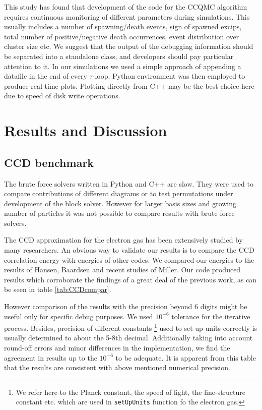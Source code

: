\documentclass[twoside,english]{uiofysmaster}
\newcommand{\classname}[1]{\texttt{#1}}
\begin{document}
This study has found that development of the code for the CCQMC
algorithm requires continuous monitoring of different parameters
during simulations. This usually includes a number of spawning/death
events, sign of spawned excips, total number of positive/negative
death occurrences, event distribution over cluster size etc.  We
suggest that the output of the debugging information should be separated into a
standalone class, and developers should pay particular attention to
it. In our simulations we used a simple approach of appending a
datafile in the end of every $\tau$-loop. Python environment was then
employed to produce real-time plots. Plotting directly from C++ may be
the best choice here due to speed of disk write operations.

\chapter{Results and Discussion}






\section{CCD benchmark}

The brute force solvers written in Python and C++ are slow. They were
used to compare contributions of different diagrams or to test
permutations under development of the block solver. However for larger
basis sizes and growing number of particles it was not possible to
compare results with brute-force solvers.

The CCD approximation for the electron gas has been extensively studied by
many researchers. An obvious way to validate our results is to compare
the CCD correlation energy with energies of other codes. We compared our
energies to the results of Hansen\cite{HansenCoupledclusterstudies},
Baardsen \cite{BaardsenCoupledclustertheoryinfinite2014} and recent
studies of Miller\cite{MillerQuantumMechanicalStudies2017}. Our code
produced results which corroborate the findings of a great deal of the
previous work, as can be seen in table \ref{tab:CCDcompar}.

However comparison of the results with the precision beyond 6 digits
might be useful only for specific debug purposes. We used $10^{-6}$
tolerance for the iterative process. Besides, precision of different
constants \footnote{We refer here to the Planck constant, the speed of
	light, the fine-structure constant etc. which are used in
	\classname{setUpUnits} function fo the electron gas.} used to set up
units correctly is usually determined to about the 5-8th
decimal. Additionally taking into account round-off errors and minor
differences in the implementation, we find the agreement in results up
to the $10^{-6}$ to be adequate.  It is apparent from this table that
the results are consistent with above mentioned numerical precision.
\end{document}
